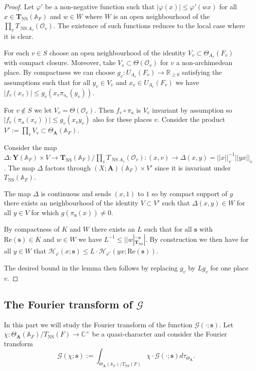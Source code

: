\documentclass[a4paper,11pt,reqno]{amsart}
\newcommand{\R}{\mathbb{R}}
\newcommand{\C}{\mathbb{C}}
\newcommand{\A}{\mathbb{A}}
\DeclareMathOperator{\NS}{NS}
\renewcommand{\Re}{\mathrm{Re}}
\theoremstyle{definition}
\begin{document}
\begin{proof}
	Let $\varphi'$ be a non-negative function such that $|\varphi(x)| \leq \varphi'(w x)$ for all $x \in \mathbf{T}_{\NS}(\A_F)$ and $w \in W$ where $W$ is an open neighbourhood of the $\prod_v T_{\NS A_v}(\mathcal{O}_v)$. The existence of such functions reduces to the local case where it is clear.
	
	For each $v \in S$ choose an open neighbourhood of the identity $V_v \subset \Theta_{A_v}(F_v)$ with compact closure. Moreover, take $V_v \subset \Theta(\mathcal{O}_v)$ for $v$ a non-archimedean place. By compactness we can choose $g_v: U_{A_v}(F_v) \to \R_{\geq 0}$ satisfying the assumptions such that for all $y_v \in V_v$ and $x_v \in U_{A_v}(F_v)$ we have $|f_v(x_v)| \leq g_v(x_v\pi_{a_v}(y_v))$.

	For $v \not \in S$ we let $V_v = \Theta(\mathcal{O}_v)$. Then $f_v \circ \pi_{a}$ is $V_v$ invariant by assumption so $|f_v(\pi_{a}(x_v))| \leq g_v(x_v y_v)$ also for these places $v$. Consider the product $V' := \prod_v V_v \subset \Theta_{\mathbf{A}}(\A_F)$.
	
	Consider the map $\Delta:\mathbf{Y}(\A_F) \times V \to \mathbf{T}_{\NS}(\A_F)/\prod_v T_{\NS A_v}(\mathcal{O}_v) : (x,v) \to \Delta(x,y) = ||x||_v^{-1} ||y x||_v$. The map $\Delta$ factors through $(X; \mathbf{A})(\A_F) \times V'$ since it is invariant under $T_{\NS}(\A_F)$. 
	
	The map $\Delta$ is continuous and sends $(x, 1)$ to $1$ so by compact support of $g$ there exists an neighbourhood of the identity $V \subset V'$ such that $\Delta(x, y) \in W$ for all $y \in V$ for which $g( \pi_{\mathfrak{a}}(x)) \neq 0$.
	
	By compactness of $K$ and $W$ there exists an $L$ such that for all $\bm{s}$ with $\Re(\bm{s}) \in K$ and $w \in W$ we have $L^{-1} \leq ||w|_{\mathbf{T}_{\NS}}^{-\bm{s}}|$. By construction we then have for all $y \in W$ that $\mathcal{H}_{\varphi}(x ; {\bm{s}}) \leq L \cdot \mathcal{H}_{\varphi'}(y x ; {\Re(\bm{s})})$.
	
	The desired bound in the lemma then follows by replacing $g_v$ by $L g_v$ for one place $v$.
\end{proof}
\subsection{The Fourier transform of \texorpdfstring{$\mathcal{G}$}{HL}}\label{sec:Fourier transform of G}
In this part we will study the Fourier transform of the function $\mathcal{G}(\cdot; \bm{s})$. Let $\chi: \Theta_{\mathbf{A}}(\A_F)/T_{\NS}(F) \to \C^{\times}$ be a quasi-character and consider the Fourier transform
\begin{equation*}
	\hat{\mathcal{G}}(\chi ; \bm{s}) := \int_{\Theta_{\mathbf{A}}(\A_F)/T_{\NS}(F)} \chi \cdot \mathcal{G}(\cdot ;\bm{s})d\tau_{\Theta_{\mathbf{A}}}.
\end{equation*}
\end{document}
